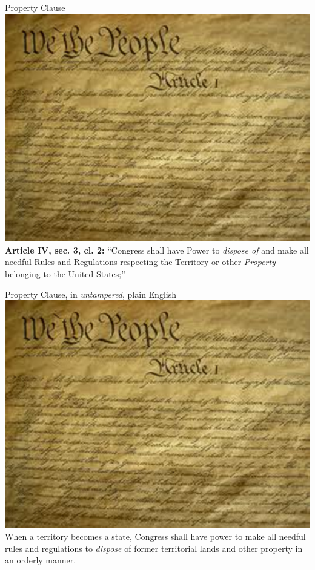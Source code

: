 \begin{frame}{Property Clause}
   \centering
   \includegraphics[height=.7\textheight]{img/constitution.png} \\
   \textbf{Article IV, sec. 3, cl. 2:} ``Congress shall have Power to \emph{dispose of} and make all needful Rules and Regulations respecting the Territory or other \emph{Property} belonging to the United States;''
\end{frame}

\begin{frame}{Property Clause, in \emph{untampered}, plain English}
   \centering
   \includegraphics[height=.7\textheight]{img/constitution.png} \\
   When a territory becomes a state, Congress shall have power to make all needful rules and regulations to \emph{dispose} of former territorial lands and other property in an orderly manner.
\end{frame}

